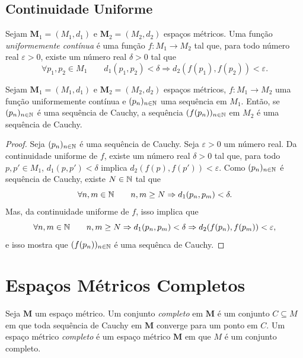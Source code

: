 \subsection{Continuidade Uniforme}

\begin{defi}
	Sejam $\bm M_1 = (M_1,d_1)$ e $\bm M_2 = (M_2,d_2)$ espaços métricos. Uma função \emph{uniformemente contínua} é uma função $f: M_1 \to M_2$ tal que, para todo número real $\varepsilon > 0$, existe um número real $\delta > 0$ tal que
	\begin{equation*}
	\forall p_1,p_2 \in M_1 \qquad d_1(p_1,p_2) < \delta \Rightarrow d_2(f(p_1),f(p_2)) < \varepsilon.
	\end{equation*}
\end{defi}

\begin{prop}
	Sejam $\bm M_1 = (M_1,d_1)$ e $\bm M_2 = (M_2,d_2)$ espaços métricos, $f: M_1 \to M_2$ uma função uniformemente contínua e $(p_n)_{n \in \mathbb{N}}$ uma sequência em $M_1$. Então, se $(p_n)_{n \in \mathbb{N}}$ é uma sequência de Cauchy, a sequência $(f(p_n))_{n \in \mathbb{N}}$ em $M_2$ é uma sequência de Cauchy.
\end{prop}
\begin{proof}
	Seja $(p_n)_{n \in \mathbb{N}}$ é uma sequência de Cauchy. Seja $\varepsilon > 0$ um número real. Da continuidade uniforme de $f$, existe um número real $\delta > 0$ tal que, para todo $p,p' \in M_1$, $d_1(p,p') < \delta$ implica $d_2(f(p),f(p')) < \varepsilon$. Como $(p_n)_{n \in \mathbb{N}}$ é sequência de Cauchy, existe $N \in \mathbb{N}$ tal que
	\begin{equation*}
	\forall n,m \in \mathbb{N} \qquad n,m \geq N \Rightarrow d_1(p_n,p_m) < \delta.
	\end{equation*}
Mas, da continuidade uniforme de $f$, isso implica que
	\begin{equation*}
	\forall n,m \in \mathbb{N} \qquad n,m \geq N \Rightarrow d_1(p_n,p_m) < \delta  \Rightarrow d_2(f(p_n),f(p_m)) < \varepsilon,
	\end{equation*}
e isso mostra que $(f(p_n))_{n \in \mathbb{N}}$ é uma sequênca de Cauchy.
\end{proof}


\section{Espaços Métricos Completos}

\begin{defi}
	Seja $\bm M$ um espaço métrico. Um conjunto \emph{completo} em $\bm M$ é um conjunto $C \subseteq M$ em que toda sequência de Cauchy em $\bm M$ converge para um ponto em $C$. Um espaço métrico \emph{completo} é um espaço métrico  $\bm M$ em que $M$ é um conjunto completo.
\end{defi}

